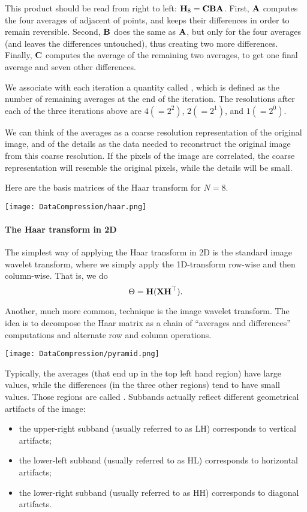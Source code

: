 This product should be read from right to left: ${\bf H}_8 = {\bf C}{\bf B}{\bf A}$. First, ${\bf A}$ computes the four averages of adjacent of points, and keeps their differences in order to remain reversible. Second, ${\bf B}$ does the same as ${\bf A}$, but only for the four averages (and leaves the differences untouched), thus creating two more differences. Finally, ${\bf C}$ computes the average of the remaining two averages, to get one final average and seven other differences.

We associate with each iteration a quantity called , which is defined as the number of remaining averages at the end of the iteration. The resolutions after each of the three iterations above are $4(= 2^2)$, $2(= 2^1)$, and $1(= 2^0)$.

We can think of the averages as a coarse resolution representation of
the original image, and of the details as the data needed to reconstruct the original image from this coarse resolution. If the pixels of the image are correlated, the coarse representation will resemble the original pixels, while the details will be small.

Here are the basis matrices of the Haar transform for $N = 8$.

\begin{center}
\texttt{[image: DataCompression/haar.png]}
\end{center}

\paragraph{The Haar transform in 2D}
The simplest way of applying the Haar transform in 2D is the standard image wavelet transform, where we simply apply the 1D-transform row-wise and then column-wise. That is, we do
\[
    \Theta = {\bf H} ({\bf X}{\bf H}^\top).
\]

Another, much more common, technique is the  image wavelet transform. The idea is to decompose the Haar matrix as a chain of ``averages and differences'' computations and alternate row and column operations. 

\begin{center}
\texttt{[image: DataCompression/pyramid.png]}
\end{center}


Typically, the averages (that end up in the top left hand region) have large values, while the differences (in the three other regions) tend to have small values. Those regions are called . Subbands actually reflect different geometrical artifacts of the image:
\begin{itemize}
    \item  the upper-right subband (usually referred to as LH) corresponds to vertical artifacts;

    \item the lower-left subband (usually referred to as HL) corresponds to horizontal artifacts;
    
    \item the lower-right subband (usually referred to as HH) corresponds to diagonal artifacts.
\end{itemize}

